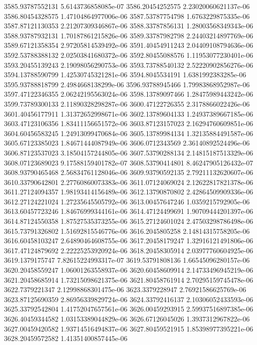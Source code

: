 {3585.93787552131 5.6143736858085e-07
3586.20454252575 2.23020060621137e-06
3586.80454328575 1.47104864977006e-06
3587.53787754798 1.6763229875335e-06
3587.87121130353 2.21207309346867e-06
3588.33787856131 1.28003568349343e-06
3588.93787932131 1.70187861215826e-06
3589.33787982798 2.24403214897769e-06
3589.67121358354 2.97205814539492e-06
3591.40454911243 2.04409108794636e-06
3592.53788388132 2.02503841680372e-06
3592.80455088576 1.11953077230401e-06
3593.20455139243 2.19098056290753e-06
3593.73788540132 2.52220902856276e-06
3594.13788590799 1.42530745321281e-06
3594.8045534191 1.6381992383285e-06
3595.93788818799 2.4984668138299e-06
3596.93788945466 1.79983868952987e-06
3597.47122346355 2.06242195563024e-06
3598.13789097466 1.28475989443242e-06
3599.73789300133 2.11890328298287e-06
3600.47122726355 2.3178866022426e-06
3601.40456177911 1.31372652998671e-06
3602.13789604133 1.24937389667185e-06
3603.47123106356 1.83411156651572e-06
3603.87123157023 2.16294760609851e-06
3604.60456583245 1.24913099470684e-06
3605.13789984134 1.32135884491587e-06
3605.67123385023 1.84671444087949e-06
3606.0712343569 2.36140892524496e-06
3606.87123537023 3.18504157244805e-06
3607.53790288134 2.14815187513329e-06
3608.07123689023 9.17588159401782e-07
3608.53790414801 8.46247905126432e-07
3608.93790465468 2.56834761128046e-06
3609.93790592135 2.79211132620607e-06
3610.33790642801 2.27760860073383e-06
3611.07124069024 2.12622817821378e-06
3611.27124094357 1.98193414156489e-06
3612.13790870802 2.42864509909336e-06
3612.27124221024 1.27235645505792e-06
3613.00457647246 1.0359215792905e-06
3613.60457723246 1.84676999344161e-06
3614.47124499691 1.90709444201397e-06
3614.87124550358 1.87527535373255e-06
3615.27124601024 2.47503298786498e-06
3615.73791326802 1.51692815546776e-06
3616.2045805258 2.14814315758205e-06
3616.60458103247 2.64890464608755e-06
3617.20458179247 1.32916121491806e-06
3617.47124879692 2.22225253920924e-06
3618.20458305914 2.03977760604925e-06
3619.1379175747 7.82615224993317e-07
3619.53791808136 1.66545096280157e-06
3620.20458559247 1.06001263558937e-06
3620.60458609914 2.14733496945219e-06
3621.20458685914 1.73215098621375e-06
3621.80458761914 2.70295159745478e-06
3622.7379221347 2.12998868301475e-06
3623.3379228947 2.76921586625769e-06
3623.87125690359 2.86956339829724e-06
3624.33792416137 2.10306052433593e-06
3625.33792542804 1.41752047657561e-06
3626.00459293915 2.59937516897385e-06
3626.40459344582 1.03153389044829e-06
3626.67126045026 1.3937312967822e-06
3627.00459420582 1.93714516494837e-06
3627.80459521915 1.85398977395221e-06
3628.20459572582 1.41351400857445e-06
}
